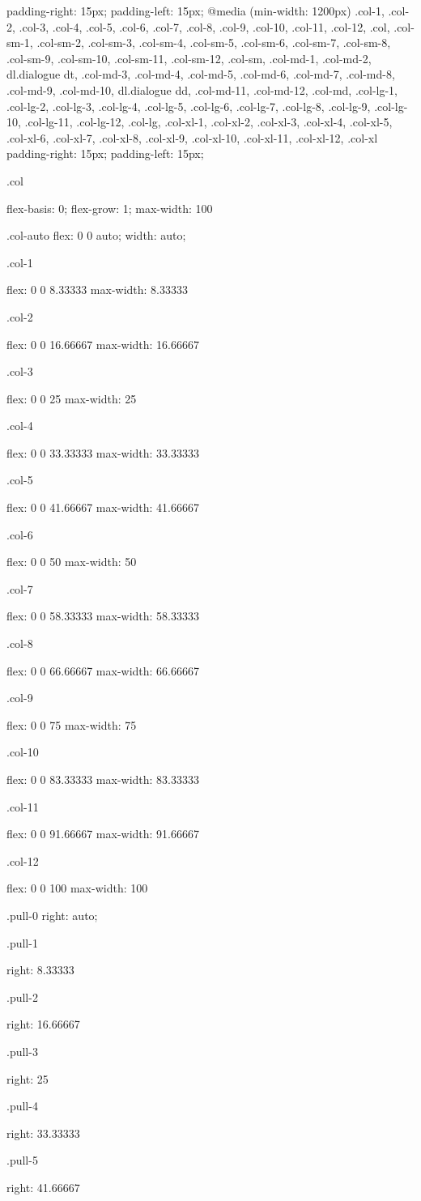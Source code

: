 {{{{{{{{{{{{      padding-right: 15px;
      padding-left: 15px; } }
  @media (min-width: 1200px) {
    .col-1, .col-2, .col-3, .col-4, .col-5, .col-6, .col-7, .col-8, .col-9, .col-10, .col-11, .col-12, .col, .col-sm-1, .col-sm-2, .col-sm-3, .col-sm-4, .col-sm-5, .col-sm-6, .col-sm-7, .col-sm-8, .col-sm-9, .col-sm-10, .col-sm-11, .col-sm-12, .col-sm, .col-md-1, .col-md-2, dl.dialogue dt, .col-md-3, .col-md-4, .col-md-5, .col-md-6, .col-md-7, .col-md-8, .col-md-9, .col-md-10, dl.dialogue dd, .col-md-11, .col-md-12, .col-md, .col-lg-1, .col-lg-2, .col-lg-3, .col-lg-4, .col-lg-5, .col-lg-6, .col-lg-7, .col-lg-8, .col-lg-9, .col-lg-10, .col-lg-11, .col-lg-12, .col-lg, .col-xl-1, .col-xl-2, .col-xl-3, .col-xl-4, .col-xl-5, .col-xl-6, .col-xl-7, .col-xl-8, .col-xl-9, .col-xl-10, .col-xl-11, .col-xl-12, .col-xl {
      padding-right: 15px;
      padding-left: 15px; } }

.col {
  flex-basis: 0;
  flex-grow: 1;
  max-width: 100%

.col-auto {
  flex: 0 0 auto;
  width: auto; }

.col-1 {
  flex: 0 0 8.33333%
  max-width: 8.33333%

.col-2 {
  flex: 0 0 16.66667%
  max-width: 16.66667%

.col-3 {
  flex: 0 0 25%
  max-width: 25%

.col-4 {
  flex: 0 0 33.33333%
  max-width: 33.33333%

.col-5 {
  flex: 0 0 41.66667%
  max-width: 41.66667%

.col-6 {
  flex: 0 0 50%
  max-width: 50%

.col-7 {
  flex: 0 0 58.33333%
  max-width: 58.33333%

.col-8 {
  flex: 0 0 66.66667%
  max-width: 66.66667%

.col-9 {
  flex: 0 0 75%
  max-width: 75%

.col-10 {
  flex: 0 0 83.33333%
  max-width: 83.33333%

.col-11 {
  flex: 0 0 91.66667%
  max-width: 91.66667%

.col-12 {
  flex: 0 0 100%
  max-width: 100%

.pull-0 {
  right: auto; }

.pull-1 {
  right: 8.33333%

.pull-2 {
  right: 16.66667%

.pull-3 {
  right: 25%

.pull-4 {
  right: 33.33333%

.pull-5 {
  right: 41.66667%

}}}}}}}}}}}}}}}}}}}}}}}}}}}}
